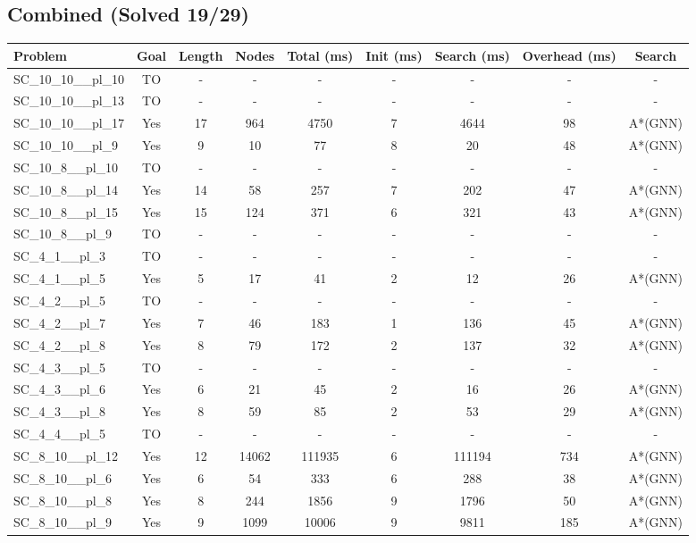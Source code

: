 \documentclass{article}
\begin{document}
\subsection*{Combined (Solved 19/29)}
\begin{tabular}{lcccccccc}
\toprule
Problem & Goal & Length & Nodes & Total (ms) & Init (ms) & Search (ms) & Overhead (ms) & Search \\
\midrule
SC\_10\_10\_\_pl\_10 & TO & - & - & - & - & - & - & - \\
SC\_10\_10\_\_pl\_13 & TO & - & - & - & - & - & - & - \\
SC\_10\_10\_\_pl\_17 & Yes & 17 & 964 & 4750 & 7 & 4644 & 98 & A*(GNN) \\
SC\_10\_10\_\_pl\_9 & Yes & 9 & 10 & 77 & 8 & 20 & 48 & A*(GNN) \\
SC\_10\_8\_\_pl\_10 & TO & - & - & - & - & - & - & - \\
SC\_10\_8\_\_pl\_14 & Yes & 14 & 58 & 257 & 7 & 202 & 47 & A*(GNN) \\
SC\_10\_8\_\_pl\_15 & Yes & 15 & 124 & 371 & 6 & 321 & 43 & A*(GNN) \\
SC\_10\_8\_\_pl\_9 & TO & - & - & - & - & - & - & - \\
SC\_4\_1\_\_pl\_3 & TO & - & - & - & - & - & - & - \\
SC\_4\_1\_\_pl\_5 & Yes & 5 & 17 & 41 & 2 & 12 & 26 & A*(GNN) \\
SC\_4\_2\_\_pl\_5 & TO & - & - & - & - & - & - & - \\
SC\_4\_2\_\_pl\_7 & Yes & 7 & 46 & 183 & 1 & 136 & 45 & A*(GNN) \\
SC\_4\_2\_\_pl\_8 & Yes & 8 & 79 & 172 & 2 & 137 & 32 & A*(GNN) \\
SC\_4\_3\_\_pl\_5 & TO & - & - & - & - & - & - & - \\
SC\_4\_3\_\_pl\_6 & Yes & 6 & 21 & 45 & 2 & 16 & 26 & A*(GNN) \\
SC\_4\_3\_\_pl\_8 & Yes & 8 & 59 & 85 & 2 & 53 & 29 & A*(GNN) \\
SC\_4\_4\_\_pl\_5 & TO & - & - & - & - & - & - & - \\
SC\_8\_10\_\_pl\_12 & Yes & 12 & 14062 & 111935 & 6 & 111194 & 734 & A*(GNN) \\
SC\_8\_10\_\_pl\_6 & Yes & 6 & 54 & 333 & 6 & 288 & 38 & A*(GNN) \\
SC\_8\_10\_\_pl\_8 & Yes & 8 & 244 & 1856 & 9 & 1796 & 50 & A*(GNN) \\
SC\_8\_10\_\_pl\_9 & Yes & 9 & 1099 & 10006 & 9 & 9811 & 185 & A*(GNN) \\

\end{tabular}
\end{document}
